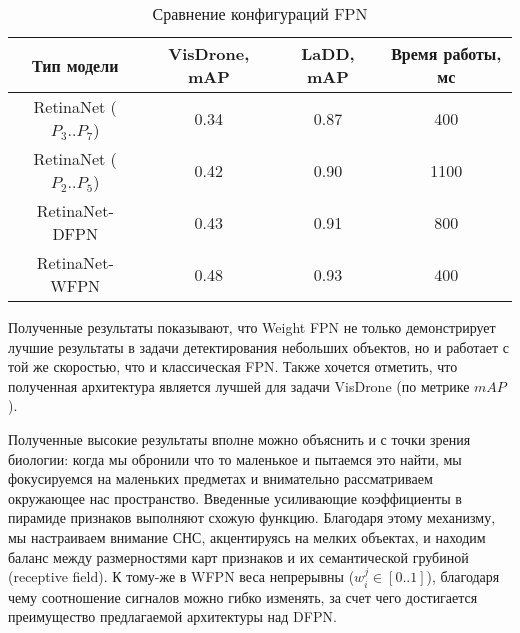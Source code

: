\begin{table}[H]
    \caption{Сравнение конфигураций FPN}\label{leaderboard-full}
    \begin{tabular}{|c|c|c|c|}
        \hline
        {Тип модели} & {VisDrone, mAP} & {LaDD, mAP} & Время работы, мс \\
        \hline
        RetinaNet ($P_3..P_7$) & 0.34 & 0.87 & 400 \\
        \hline
        RetinaNet ($P_2..P_5$) & 0.42 & 0.90 & 1100 \\
        \hline
        RetinaNet-DFPN & 0.43 & 0.91 & 800 \\
        \hline
        RetinaNet-WFPN & 0.48 & 0.93 & 400 \\
        \hline
    \end{tabular}
\end{table}

Полученные результаты показывают, что Weight FPN не только демонстрирует лучшие результаты в задачи детектирования небольших объектов, но и работает с той же скоростью, что и классическая FPN. Также хочется отметить, что полученная архитектура является лучшей для задачи VisDrone (по метрике $mAP$). 


Полученные высокие результаты вполне можно объяснить и с точки зрения биологии: когда мы обронили что то маленькое и пытаемся это найти, мы фокусируемся на маленьких предметах и внимательно рассматриваем окружающее нас пространство. Введенные усиливающие коэффициенты в пирамиде признаков выполняют схожую функцию. Благодаря этому механизму, мы настраиваем внимание СНС, акцентируясь на мелких объектах, и находим баланс между размерностями карт признаков и их семантической грубиной (receptive field). К тому-же в WFPN веса непрерывны ($w^j_i\in[0..1]$), благодаря чему соотношение сигналов можно гибко изменять, за счет чего достигается преимущество предлагаемой архитектуры над DFPN.